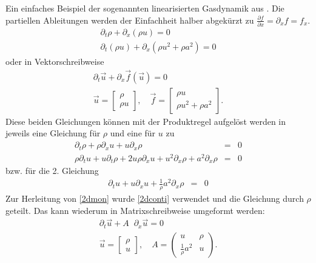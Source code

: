 Ein einfaches Beispiel der sogenannten linearisierten Gasdynamik aus
\cite{toro}. Die partiellen Ableitungen werden der Einfachheit halber
abgekürzt zu $\frac{\partial f}{\partial x} = \partial_x f = f_x $.
\begin{eqnarray}
&\partial_t \rho     + \partial_x (\rho u) = 0&\\[2mm]
&\partial_t (\rho u) + \partial_x (\rho u^2 + \rho a^2) = 0&
\end{eqnarray}
oder in Vektorschreibweise
\begin{eqnarray}
&\partial_t \vec{u} +\partial_x \vec{f}(\vec{u}) = 0&\\ &\vec{u} =
  \left[\begin{array}{c}\rho \\ \rho u\end{array}\right],\quad \vec{f}
  = \left[\begin{array}{c}\rho u \\[2mm] \rho u^2 + \rho
      a^2 \end{array}\right]. &
\end{eqnarray}
Diese beiden Gleichungen können mit der Produktregel aufgelöst werden
in jeweils eine Gleichung für $\rho$ und eine für $u$ zu
\begin{eqnarray}
\partial_t \rho + \rho \partial_x u + u \partial_x \rho &=&
0 \label{2dconti}\\[2mm] 
\rho \partial_t u + u \partial_t \rho + 2 u \rho \partial_x u
+ u^2 \partial_x \rho + a^2 \partial_x \rho  &=& 0 \nonumber 
\end{eqnarray}
bzw. für die 2. Gleichung
\begin{eqnarray}
\partial_t u + u \partial_x u + \frac{1}{\rho} a^2
\partial_x \rho &=& 0 \label{2dmon}
\end{eqnarray}
Zur Herleitung von \ref{2dmon} wurde \ref{2dconti} verwendet und die
Gleichung durch $\rho$ geteilt. Das kann wiederum in
Matrixschreibweise umgeformt werden:
\begin{eqnarray}
&\partial_t \vec{u} + A\;\; \partial_x \vec{u} = 0& \label{2dvec}\\ &\vec{u} =
  \left[\begin{array}{c}\rho \\ u\end{array}\right],\quad A =
  \left(\begin{array}{cc} u & \rho \\[2mm] \frac{1}{\rho} a^2 &
    u\end{array}\right). &
\end{eqnarray}
